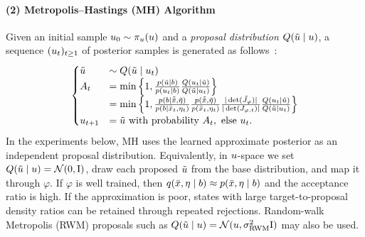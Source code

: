 \paragraph*{(2) Metropolis--Hastings (\gls*{MH}) Algorithm}

Given an initial sample $u_{0} \sim \pi_{u}(u)$ and a \textit{proposal distribution} $Q(\tilde{u} \mid u)$, a sequence $( u_{t} )_{t \ge 1}$ of posterior samples is generated as follows~\citep{metropolis_equation_1953,hastings_monte_1970}:
\begin{align}\label{eqn:metropolis_hastings}
    \begin{cases}
        \tilde{u} & \sim Q(\tilde{u} \mid u_{t})                                                                                                                                                                                                                                                                                                                                       \\
        A_t            & = \min \left\{ 1, \tfrac{p(\tilde{u} \mid b)}{p(u_{t} \mid b)} \tfrac{Q(u_{t} \mid \tilde{u})}{Q(\tilde{u} \mid u_{t})} \right\}                                                                                                                                                                                                   \\
                       & = \min \left\{ 1, \tfrac{p(b \mid \tilde{\bar{x}}, \tilde{\eta})}{p(b \mid \bar{x}_{t}, \eta_{t})} \tfrac{p(\tilde{\bar{x}}, \tilde{\eta})}{p(\bar{x}_{t}, \eta_{t})} \tfrac{| \det({\tilde{J}_{\varphi}}) |}{| \det({J_{\varphi,t}}) |} \tfrac{Q(u_{t} \mid \tilde{u})}{Q(\tilde{u} \mid u_{t})} \right\} \\
        u_{t+1}   & = \tilde{u} \text{ with probability } A_t, \text{ else } u_{t}.
    \end{cases}
\end{align}
In the experiments below, \gls*{MH} uses the learned approximate posterior as an independent proposal distribution.
Equivalently, in $u$-space we set $Q(\tilde{u} \mid u) = \mathcal{N}(\mathrm{0}, \mathrm{I})$, draw each proposed $\tilde{u}$ from the base distribution, and map it through $\varphi$.
If $\varphi$ is well trained, then $q(\bar{x}, \eta \mid b) \approx p(\bar{x}, \eta \mid b)$ and the acceptance ratio is high.
If the approximation is poor, states with large target-to-proposal density ratios can be retained through repeated rejections.
Random-walk Metropolis (\gls*{RWM}) proposals such as $Q(\tilde{u} \mid u) = \mathcal{N}(u, \sigma_{\mathrm{RWM}}^2 \mathrm{I})$ may also be used.


